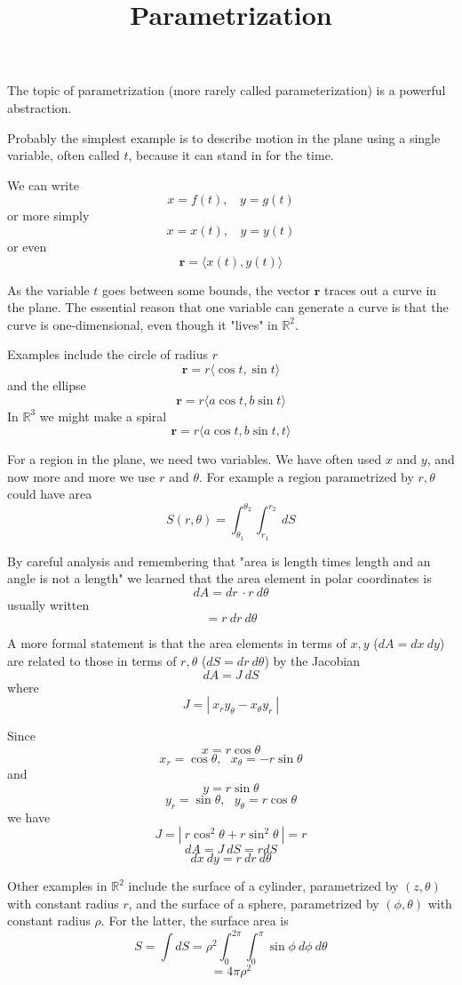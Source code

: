 \documentclass[11pt, oneside]{article}
\title{Parametrization}
\date{}
\begin{document}
\maketitle
\Large

The topic of parametrization (more rarely called parameterization) is a powerful abstraction.

Probably the simplest example is to describe motion in the plane using a single variable, often called $t$, because it can stand in for the time.

We can write
\[ x = f(t), \ \ \ \ y = g(t) \]
or more simply
\[ x = x(t), \ \ \ \ y = y(t) \]
or even
\[ \mathbf{r} = \langle x(t), y(t) \rangle \]

As the variable $t$ goes between some bounds, the vector $\mathbf{r}$ traces out a curve in the plane.  The essential reason that one variable can generate a curve is that the curve is one-dimensional, even though it "lives" in $\mathbb{R}^2$.

Examples include the circle of radius $r$
\[ \mathbf{r} = r \langle \cos t, \sin t \rangle \]
and the ellipse
\[ \mathbf{r} = r \langle a \cos t, b \sin t \rangle \]
In $\mathbb{R}^3$ we might make a spiral
\[ \mathbf{r} = r \langle a \cos t, b \sin t, t\rangle \]

For a region in the plane, we need two variables.  We have often used $x$ and $y$, and now more and more we use $r$ and $\theta$.  For example a region parametrized by $r,\theta$ could have area
\[ S(r, \theta) = \int_{\theta_1}^{\theta_2} \int_{r_1}^{r_2} \ dS  \]

By careful analysis and remembering that "area is length times length and an angle is not a length" we learned that the area element in polar coordinates is
\[ dA = dr \ \cdot r \ d \theta \]
usually written
\[ = r \ dr \ d \theta \]

A more formal statement is that the area elements in terms of $x,y$ ($dA = dx \ dy$) are related to those in terms of $r,\theta$  ($dS = dr \ d \theta$) by the Jacobian
\[ dA = J  \ dS \]
where
\[ J = | \ x_r y_{\theta}  - x_{\theta} y_r \ | \]

Since 
\[ x = r \cos \theta \]
\[ x_r = \cos \theta, \ \ \ x_{\theta} = - r \sin \theta \]
and
\[ y = r \sin \theta \]
\[ y_r = \sin \theta, \ \ \ y_{\theta} = r \cos \theta \]
we have
\[ J = | \ r \cos^2 \theta  + r \sin^2 \theta \ | = r \]
\[ dA = J \ dS = r dS \]
\[ dx \ dy = r \ dr \ d \theta \]

Other examples in $\mathbb{R}^2$ include the surface of a cylinder, parametrized by $(z,\theta)$ with constant radius $r$, and the surface of a sphere, parametrized by $(\phi,\theta)$ with constant radius $\rho$.  For the latter, the surface area is
\[ S = \int dS = \rho^2 \int_0^{2 \pi} \int_0^{\pi} \sin \phi \ d \phi \ d \theta \]
\[ = 4 \pi \rho^2 \]
\end{document}
